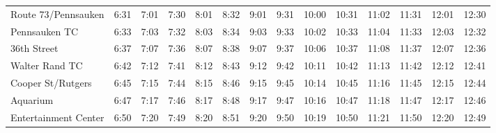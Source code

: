 \begin{center}
\begin{tabular}{@{}lrrrrrrrrrrrrr@{}}
Route 73/Pennsauken & 6:31 & 7:01 & 7:30 & 8:01 & 8:32 & 9:01 & 9:31 & 10:00 & 10:31 & 11:02 & 11:31 & 12:01 & 12:30 \\
Pennsauken TC & 6:33 & 7:03 & 7:32 & 8:03 & 8:34 & 9:03 & 9:33 & 10:02 & 10:33 & 11:04 & 11:33 & 12:03 & 12:32 \\
36th Street & 6:37 & 7:07 & 7:36 & 8:07 & 8:38 & 9:07 & 9:37 & 10:06 & 10:37 & 11:08 & 11:37 & 12:07 & 12:36 \\
Walter Rand TC & 6:42 & 7:12 & 7:41 & 8:12 & 8:43 & 9:12 & 9:42 & 10:11 & 10:42 & 11:13 & 11:42 & 12:12 & 12:41 \\
Cooper St/Rutgers & 6:45 & 7:15 & 7:44 & 8:15 & 8:46 & 9:15 & 9:45 & 10:14 & 10:45 & 11:16 & 11:45 & 12:15 & 12:44 \\
Aquarium & 6:47 & 7:17 & 7:46 & 8:17 & 8:48 & 9:17 & 9:47 & 10:16 & 10:47 & 11:18 & 11:47 & 12:17 & 12:46 \\
Entertainment Center & 6:50 & 7:20 & 7:49 & 8:20 & 8:51 & 9:20 & 9:50 & 10:19 & 10:50 & 11:21 & 11:50 & 12:20 & 12:49 \\
\bottomrule\end{tabular}\end{center}
